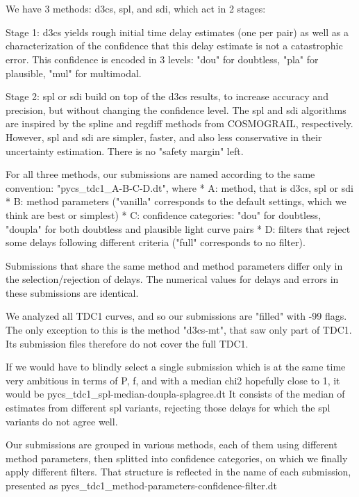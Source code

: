 \documentclass[traditabstract]{aa}
\begin{document}
\section{}

We have 3 methods: d3cs, spl, and sdi, which act in 2 stages:

Stage 1: d3cs yields rough initial time delay estimates (one per pair) as well as a characterization of the confidence that this delay estimate is not a catastrophic error. This confidence is encoded in 3 levels: "dou" for doubtless, "pla" for plausible, "mul" for multimodal.

Stage 2: spl or sdi build on top of the d3cs results, to increase accuracy and precision, but without changing the confidence level. The spl and sdi algorithms are inspired by the spline and regdiff methods from COSMOGRAIL, respectively. However, spl and sdi are simpler, faster, and also less conservative in their uncertainty estimation. There is no "safety margin" left.

For all three methods, our submissions are named according to the same convention: "pycs\_tdc1\_A-B-C-D.dt", where
 * A: method, that is d3cs, spl or sdi
 * B: method parameters ("vanilla" corresponds to the default settings, which we think are best or simplest)
 * C: confidence categories: "dou" for doubtless, "doupla" for both doubtless and plausible light curve pairs
 * D: filters that reject some delays following different criteria ("full" corresponds to no filter).

Submissions that share the same method and method parameters differ only in the selection/rejection of delays. The numerical values for delays and errors in these submissions are identical.

We analyzed all TDC1 curves, and so our submissions are "filled" with -99 flags. The only exception to this is the method "d3cs-mt", that saw only part of TDC1. Its submission files therefore do not cover the full TDC1.

If we would have to blindly select a single submission which is at the same time very ambitious in terms of P, f, and with a median chi2 hopefully close to 1, it would be
pycs\_tdc1\_spl-median-doupla-splagree.dt
It consists of the median of estimates from different spl variants, rejecting those delays for which the spl variants do not agree well.


Our submissions are grouped in various methods, each of them using different method parameters, then splitted into confidence categories, on which we finally apply different filters. That structure is reflected in the name of each submission, presented as pycs\_tdc1\_method-parameters-confidence-filter.dt
\end{document}
